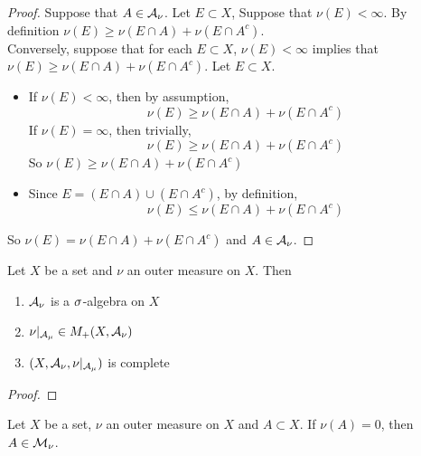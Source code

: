 \documentclass{book}
\begin{document}
	\begin{proof}
	Suppose that $A \in \mathcal{A}_{\nu}$. Let $E \subset X$, Suppose that $\nu(E) < \infty$. By definition $\nu(E) \geq \nu(E \cap A) + \nu(E \cap A^c)$. \\
	Conversely, suppose that for each $E \subset X$, $\nu(E) < \infty$ implies that $\nu(E) \geq \nu(E \cap A) + \nu(E \cap A^c)$. Let $E \subset X$. 
	\begin{itemize}
	\item If $\nu(E) < \infty$, then by assumption, 
	\begin{equation*}
	\nu(E) \geq \nu(E \cap A) + \nu(E \cap A^c)
	\end{equation*}		
	If $\nu(E) = \infty$, then trivially, 
	\begin{equation*}
	\nu(E) \geq \nu(E \cap A) + \nu(E \cap A^c)
	\end{equation*}	 
	So $\nu(E) \geq \nu(E \cap A) + \nu(E \cap A^c)$
	\item Since $E = (E \cap A) \cup (E \cap A^c)$, by definition, 
	\begin{equation*}
	\nu(E) \leq \nu(E \cap A) + \nu(E \cap A^c)
	\end{equation*}	
	\end{itemize}
	So $\nu(E) = \nu(E \cap A) + \nu(E \cap A^c)$ and $A \in \mathcal{A}_{\nu}$.
	\end{proof}





	
	\begin{ex}   
		Let $X$ be a set and $\nu$ an outer measure on $X$. Then  
		\begin{enumerate}
			\item $\mathcal{A}_{\nu}$ is a $\sigma$-algebra on $X$
			\item $\nu|_{\mathcal{A}_{\mu}} \in M_+(X, \mathcal{A}_{\nu})$
			\item $(X, \mathcal{A}_{\nu}, \nu|_{\mathcal{A}_{\mu}})$ is complete
		\end{enumerate}
	\end{ex}
	
	\begin{proof}
	\end{proof}

	\begin{ex}
		Let $X$ be a set, $\nu$ an outer measure on $X$ and $A \subset X$. If $\nu(A) = 0$, then $A \in \mathcal{M}_{\nu}$.
	\end{ex}
	
\end{document}
